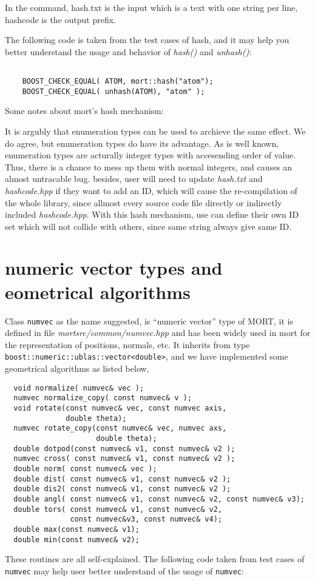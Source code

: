 \documentclass[letterpaper]{book}
\begin{document}
In the command, hash.txt is the input which is a text with one string per line, hashcode is the output prefix.

The following code is taken from the test cases of hash, and it may help you better understand the usage and behavior of 
{\it hash()} and {\it unhash()}:

\begin{lstlisting}

    BOOST_CHECK_EQUAL( ATOM, mort::hash("atom");
    BOOST_CHECK_EQUAL( unhash(ATOM), "atom" );

\end{lstlisting}

Some notes about mort's hash mechanism:

It is argubly that enumeration types can be used to archieve the same effect. We do agree, but enumeration
types do have its advantage. As is well known, enumeration types are acturally integer types with accesending order of
value. Thus, there is a chance to mess up them with normal integers, and causes an almost untracable bug. besides, user
will need to update {\it hash.txt} and {\it hashcode.hpp} if they want to add an ID, which will cause the re-compilation
of the whole library, since allmost every source code file directly or indirectly included {\it hashcode.hpp}. With
this hash mechanism, use can define their own ID set which will not collide with others, since same string always give
same ID.


\section{numeric vector types and eometrical algorithms}
  Class \lstinline$numvec$ as the name suggested, is ``numeric vector'' type of MORT, it is defined in 
file {\it mortsrc/common/numvec.hpp} and has been widely used in mort for the representation of positions, 
normals, etc. It inherits from type \lstinline$boost::numeric::ublas::vector<double>$, and we have implemented 
some geometrical algorithms as listed below,

\begin{lstlisting}
  void normalize( numvec& vec );
  numvec normalize_copy( const numvec& v );
  void rotate(const numvec& vec, const numvec axis, 
              double theta);
  numvec rotate_copy(const numvec& vec, numvec axs, 
                     double theta);
  double dotpod(const numvec& v1, const numvec& v2 );
  numvec cross( const numvec& v1, const numvec& v2 );
  double norm( const numvec& vec ); 
  double dist( const numvec& v1, const numvec& v2 );
  double dis2( const numvec& v1, const numvec& v2 );
  double angl( const numvec& v1, const numvec& v2, const numvec& v3);
  double tors( const numvec& v1, const numvec& v2, 
               const numvec&v3, const numvec& v4);
  double max(const numvec& v1);
  double min(const numvec& v2); 
\end{lstlisting}
These routines are all self-explained. The following code taken from test cases of 
\lstinline$numvec$ may help user better understand of the usage of \lstinline$numvec$:
\end{document}
